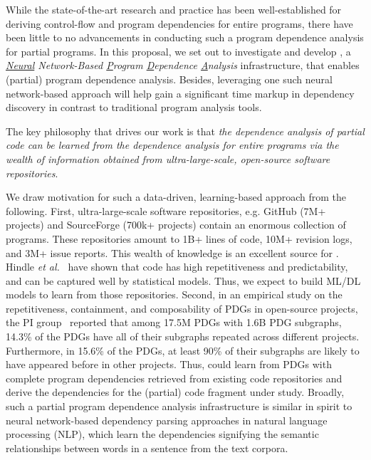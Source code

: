 While the state-of-the-art research and practice has been well-established for deriving control-flow and program dependencies for entire programs, there have been little to no advancements in conducting such a program dependence analysis for partial programs. In this proposal, we set out to investigate and develop {\tool}, a {\em \underline{Neural} Network-Based \underline{P}rogram \underline{D}ependence \underline{A}nalysis} infrastructure, that enables (partial) program dependence analysis. Besides, leveraging one such neural network-based approach will help gain a significant time markup in dependency discovery in contrast to traditional program analysis tools.


\begin{center}
    \begin{minipage}{33.5em}
    The key philosophy that drives our work is that {\em the dependence analysis of partial code can be learned from the dependence analysis for entire programs via the wealth of information obtained from ultra-large-scale, open-source software repositories}.
    \end{minipage}
\end{center}


We draw motivation for such a data-driven, learning-based approach from the following. First, ultra-large-scale software repositories, e.g. GitHub (7M+ projects) and SourceForge (700k+ projects) contain an enormous collection of programs. These repositories amount to 1B+ lines of code, 10M+ revision logs, and 3M+ issue reports. This wealth of knowledge is an excellent source for {\tool}. Hindle {\em et al.}~\cite{} have shown that code has high repetitiveness and predictability, and can be captured well by statistical models. Thus, we expect to build ML/DL models to learn from those repositories. Second, in an empirical study on the repetitiveness, containment, and composability of PDGs in open-source projects, the PI group~\cite{} reported that among 17.5M PDGs with 1.6B PDG subgraphs, 14.3\% of the PDGs have all of their subgraphs repeated across different projects. Furthermore, in 15.6\% of the PDGs, at least 90\% of their subgraphs are likely to have appeared before in other projects. Thus, {\tool} could learn from PDGs with complete program dependencies retrieved from existing code repositories and derive the dependencies for the (partial) code fragment under study. Broadly, such a partial program dependence analysis infrastructure is similar in spirit to neural network-based dependency parsing approaches in natural language processing (NLP), which learn the dependencies signifying the semantic relationships between words in a sentence from the text corpora.

